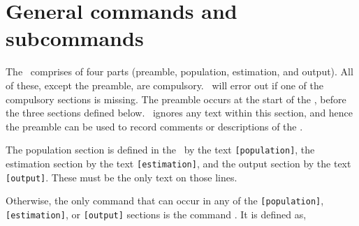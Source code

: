 \section{General commands and subcommands\label{sec:general-syntax}}

The \config\ comprises of four parts (preamble, population, estimation, and output). All of these, except the preamble, are compulsory. \SPM\ will error out if one of the compulsory sections is missing. The preamble occurs at the start of the \config, before the three sections defined below. \SPM\ ignores any text within this section, and hence the preamble can be used to record comments or descriptions of the \config. 

The population section is defined in the \config\ by the text \texttt{[population]}, the estimation section by the text \texttt{[estimation]}, and the output section by the text \texttt{[output]}. These must be the only text on those lines.

Otherwise, the only command that can occur in any of the \texttt{[population]}, \texttt{[estimation]}, or \texttt{[output]} sections is the command . It is defined as,


